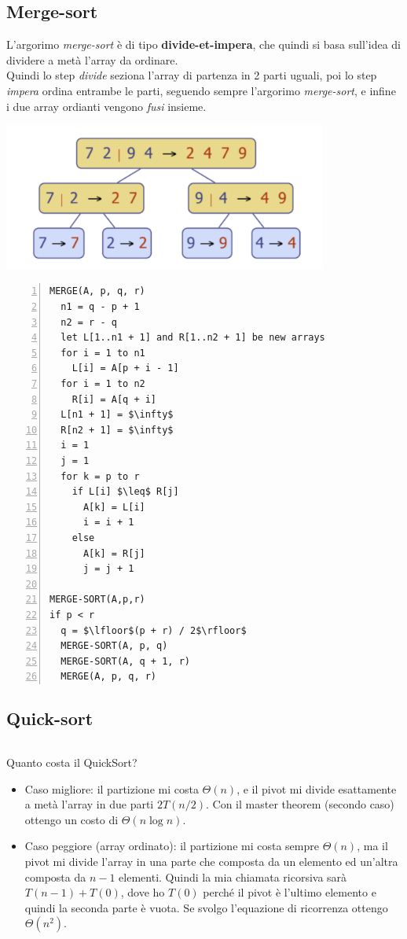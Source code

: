 \documentclass{article}
\begin{document}
\subsection{Merge-sort}
L'argorimo \emph{merge-sort} è di tipo \textbf{divide-et-impera}, che quindi si basa sull'idea di dividere a metà l'array da ordinare. \\
Quindi lo step \emph{divide} seziona l'array di partenza in 2 parti uguali, poi lo step \emph{impera} ordina entrambe le parti, seguendo sempre l'argorimo \emph{merge-sort}, e infine i due array ordianti vengono \emph{fusi} insieme.
\begin{center}
  \includegraphics[width=0.8\textwidth]{merge_sort.png}
\end{center}
\begin{lstlisting}[mathescape, numbers=left]
MERGE(A, p, q, r)
  n1 = q - p + 1
  n2 = r - q
  let L[1..n1 + 1] and R[1..n2 + 1] be new arrays
  for i = 1 to n1
    L[i] = A[p + i - 1]
  for i = 1 to n2
    R[i] = A[q + i]
  L[n1 + 1] = $\infty$
  R[n2 + 1] = $\infty$
  i = 1
  j = 1
  for k = p to r
    if L[i] $\leq$ R[j]
      A[k] = L[i]
      i = i + 1
    else
      A[k] = R[j]
      j = j + 1

MERGE-SORT(A,p,r)
if p < r
  q = $\lfloor$(p + r) / 2$\rfloor$
  MERGE-SORT(A, p, q)
  MERGE-SORT(A, q + 1, r)
  MERGE(A, p, q, r)
\end{lstlisting}
\subsection{Quick-sort}
\begin{lstlisting}[numbers=left]

\end{lstlisting}
Quanto costa il QuickSort?
\begin{itemize}
  \item Caso migliore: il partizione mi costa \(\Theta(n)\), e il pivot mi divide esattamente a metà l'array in due parti \(2T(n/2)\). Con il master theorem (secondo caso) ottengo un costo di \(\Theta(n \log n)\).
  \item Caso peggiore (array ordinato): il partizione mi costa sempre \(\Theta(n)\), ma il pivot mi divide l'array in una parte che composta da un elemento ed un'altra composta da \(n-1\) elementi. Quindi la mia chiamata ricorsiva sarà \(
        T(n-1) + T(0)\), dove ho \(T(0)\) perché il pivot è l'ultimo elemento e quindi la seconda parte è vuota. Se svolgo l'equazione di ricorrenza ottengo \(\Theta(n^2)\).
\end{itemize}
\pagebreak
\end{document}
